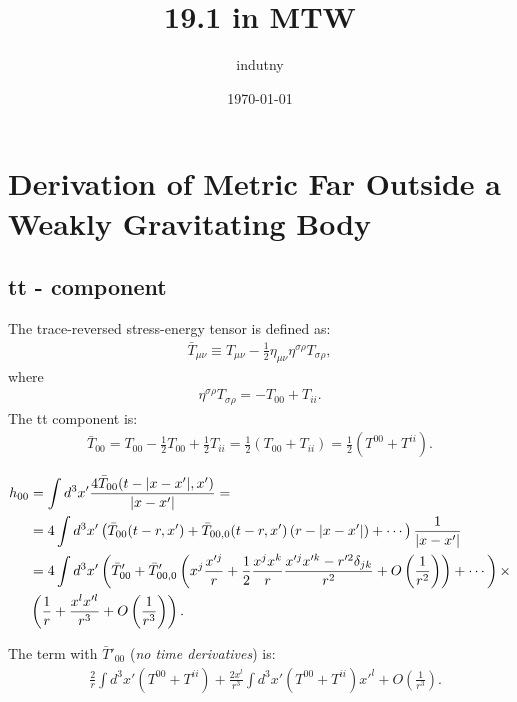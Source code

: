 \documentclass[aps,prd,preprint]{revtex4-1}
\begin{document}
\title{19.1  in MTW}
\author{indutny}
\date{\today}
\noaffiliation

\maketitle

\section{Derivation of Metric Far Outside a Weakly Gravitating Body}

\subsection{tt - component}

The trace-reversed stress-energy tensor is defined as:
\begin{align}
\bar{T}_{\mu\nu} \equiv T_{\mu\nu} - \frac{1}{2} \eta_{\mu\nu} \eta^{\sigma \rho} T_{\sigma \rho},
\end{align}
where
\begin{align}
\eta^{\sigma \rho} T_{\sigma \rho} = -T_{00} + T_{ii}.
\end{align}
The tt component is:
\begin{align}
\bar{T}_{00} = T_{00} - \frac{1}{2} T_{00} + \frac{1}{2} T_{ii} = \frac{1}{2} \left( T_{00} + T_{ii} \right) =
  \frac{1}{2} \left(T^{00} + T^{ii} \right).
\end{align}

\begin{align}
h_{00} & = \int d^3 x' \frac{4 \bar{T}_{00}(t - |x - x'|, x')}{|x - x'|} = \\
 & = 4 \int d^3 x' \left( \bar{T}_{00}(t - r, x') + \bar{T}_{00, 0} (t - r, x') \left( r - |x - x'| \right) + \cdots \right) \frac{1}{|x - x'|} \\
 & = 4 \int d^3 x' \left( \bar{T}'_{00} + \bar{T}'_{00, 0} \left( x^j \frac{x'^j}{r} +
   \frac{1}{2} \frac{x^j x^k}{r} \frac{x'^j x'^k - r'^2 \delta_{jk}}{r^2} + O\left(\frac{1}{r^2}\right) \right) + \cdots \right) \times \notag \\
   & \left( \frac{1}{r} + \frac{x^l x'^l}{r^3} + O\left( \frac{1}{r^3} \right) \right).
\end{align}

The term with $\bar{T}'_{00}$ (\emph{no time derivatives}) is:
\begin{align}\label{eq:n0-tt}
& \frac{2}{r} \int d^3 x' \left( T^{00} + T^{ii} \right) + \frac{2 x^l}{r^3} \int d^3 x' \left( T^{00} + T^{ii} \right) x'^l +
  O\left(\frac{1}{r^3} \right).
\end{align}
\end{document}
